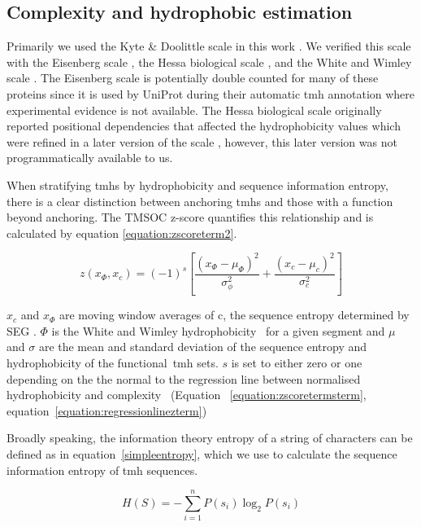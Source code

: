 \subsection{Complexity and hydrophobic estimation}
Primarily we used the Kyte \& Doolittle scale in this work \cite{Kyte1982}.
We verified this scale with the Eisenberg scale \cite{Eisenberg1984}, the Hessa biological scale \cite{Hessa2005}, and the White and Wimley scale \cite{White1999}.
The Eisenberg scale is potentially double counted for many of these proteins since it is used by UniProt during their automatic \gls{tmh} annotation where experimental evidence is not available.
The Hessa biological scale originally reported positional dependencies that affected the hydrophobicity values which were refined in a later version of the scale \cite{Hessa2007}, however, this later version was not programmatically available to us.

When stratifying \gls{tmh}s by hydrophobicity and sequence information entropy, there is a clear distinction between anchoring \gls{tmh}s and those with a function beyond anchoring.
The TMSOC  z\--score quantifies this relationship and is calculated by equation \ref{equation:zscoreterm2}.

\begin{equation} \label{equation:zscoreterm2}
z({x}_{\Phi},{x}_{c})={(-1)}^{s}\left[\frac{{({x}_{\Phi}-{\mu}_{\Phi})}^{2}}{{\sigma}_{\phi}^{2}}+\frac{{({x}_{c}-{\mu}_{c})}^{2}}{{\sigma}_{c}^{2}}\right]
\end{equation}

$x_c$ and $x_\Phi$ are moving window averages of c, the sequence entropy determined by SEG \cite{WOOTTON1994269, Wootton1996}. $\Phi$ is the White and Wimley hydrophobicity~\cite{White1999} for a given segment and $\mu$ and $\sigma$ are the mean and standard deviation of the sequence entropy and hydrophobicity of the functional~\gls{tmh} sets.
$s$ is set to either zero or one depending on the the normal to the regression line between normalised hydrophobicity and complexity~\cite{Wong2011} (Equation ~\ref{equation:zscoretermsterm}, equation~\ref{equation:regressionlinezterm})

Broadly speaking, the information theory entropy of a string of characters can be defined as in equation~\ref{simpleentropy}, which we use to calculate the sequence information entropy of \gls{tmh} sequences.

\begin{equation} \label{simpleentropy}
H \left( S \right)=-\sum _{ i=1 }^{ n }{ { P }\left({ s }_{ i }\right)\log _{ 2 }{ P } \left({ s }_{ i } \right)}
\end{equation}

